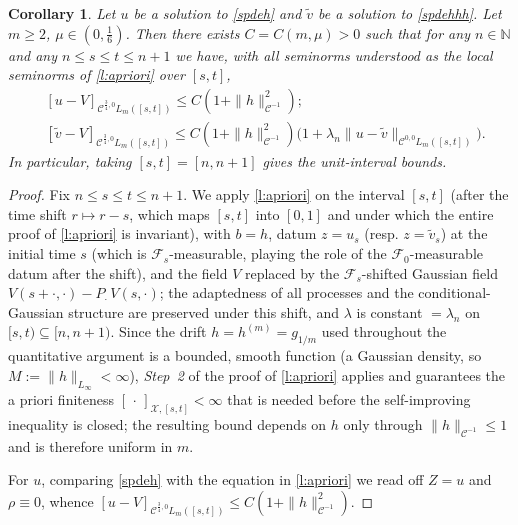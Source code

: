 \documentclass[12pt]{article}
\newtheorem{corollary}[theorem]{Corollary}
\theoremstyle{definition}
\DeclareMathOperator{\1}{\mathbbm{1}}%
\renewcommand{\ge}{\geqslant}
\renewcommand{\le}{\leqslant}
\newcommand{\wt}{\widetilde}
\newcommand{\C}{\mathcal{C}}
\newcommand{\F}{\mathcal{F}}
\newcommand{\N}{\mathbb{N}}
\newcommand{\X}{\mathcal{X}}
\begin{document}
\begin{corollary}\label{c:hmain}
Let $u$ be a solution to \eqref{spdeh} and $\wt v$ be a solution to 
\eqref{spdehhh}. Let $m\ge2$, $\mu\in(0,\frac16)$. Then there exists 
$C=C(m,\mu)>0$ such that for any $n\in\N$ and any $n\le s\le t\le n+1$ we have, with
all seminorms understood as the local seminorms of \cref{l:apriori} over $[s,t]$,
\begin{align*}
&[u-V]_{\C^{\frac34,0}L_m([s,t])}\le  C (1+\|h\|_{\C^{-1}}^2);\\
&[\wt v-V]_{\C^{\frac34,0}L_m([s,t])}\le  C (1+\|h\|_{\C^{-1}}^2)\bigl(1+\lambda_n\|u-\wt v\|_{\C^{0,0} L_m([s,t])}\bigr).
\end{align*}
In particular, taking $[s,t]=[n,n+1]$ gives the unit-interval bounds.
\end{corollary}
\begin{proof}
Fix $n\le s\le t\le n+1$. We apply \cref{l:apriori} on the interval $[s,t]$ (after the
time shift $r\mapsto r-s$, which maps $[s,t]$ into $[0,1]$ and under which the entire
proof of \cref{l:apriori} is invariant), with $b=h$, datum
$z=u_s$ (resp. $z=\wt v_s$) at the initial time $s$ (which is $\F_s$-measurable, playing
the role of the $\F_0$-measurable datum after the shift), and the field $V$ replaced by
the $\F_s$-shifted Gaussian field $V(s+\cdot,\cdot)-P_\cdot\,V(s,\cdot)$; the adaptedness
of all processes and the conditional-Gaussian structure are preserved under this shift,
and $\lambda$ is constant $=\lambda_n$ on $[s,t)\subseteq[n,n+1)$. Since the drift $h=h^{(m)}=g_{1/m}$ used throughout the quantitative argument is a
bounded, smooth function (a Gaussian density, so $M:=\|h\|_{L_\infty}<\infty$),
\emph{Step~2} of the proof of \cref{l:apriori} applies and guarantees the a priori
finiteness $[\,\cdot\,]_{\X,[s,t]}<\infty$ that is needed before the self-improving
inequality is closed; the resulting bound depends on $h$ only through
$\|h\|_{\C^{-1}}\le1$ and is therefore uniform in $m$.

For $u$, comparing \eqref{spdeh} with the equation in \cref{l:apriori} we read
off $Z=u$ and $\rho\equiv0$, whence
$[u-V]_{\C^{\frac34,0}L_m([s,t])}\le C(1+\|h\|_{\C^{-1}}^2)$.


\end{proof}
\end{document}
